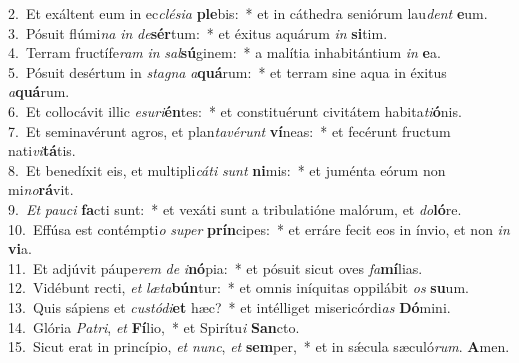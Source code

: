 {2.~}Et exáltent eum in ec\textit{clé}\textit{si}\textit{a} \textbf{ple}bis:~* et in cáthedra seniórum lau\textit{dent} \textbf{e}um.\\
{3.~}Pósuit flúmi\textit{na} \textit{in} \textit{de}\textbf{sér}tum:~* et éxitus aquárum \textit{in} \textbf{si}tim.\\
{4.~}Terram fructífe\textit{ram} \textit{in} \textit{sal}\textbf{sú}ginem:~* a malítia inhabitántium \textit{in} \textbf{e}a.\\
{5.~}Pósuit desértum in \textit{sta}\textit{gna} \textit{a}\textbf{quá}rum:~* et terram sine aqua in éxitus \textit{a}\textbf{quá}rum.\\
{6.~}Et collocávit illic \textit{e}\textit{su}\textit{ri}\textbf{én}tes:~* et constituérunt civitátem habita\textit{ti}\textbf{ó}nis.\\
{7.~}Et seminavérunt agros, et plan\textit{ta}\textit{vé}\textit{runt} \textbf{ví}neas:~* et fecérunt fructum nati\textit{vi}\textbf{tá}tis.\\
{8.~}Et benedíxit eis, et multipli\textit{cá}\textit{ti} \textit{sunt} \textbf{ni}mis:~* et juménta eórum non mi\textit{no}\textbf{rá}vit.\\
{9.~}\textit{Et} \textit{pau}\textit{ci} \textbf{fa}cti sunt:~* et vexáti sunt a tribulatióne malórum, et \textit{do}\textbf{ló}re.\\
{10.~}Effúsa est contémpti\textit{o} \textit{su}\textit{per} \textbf{prín}cipes:~* et erráre fecit eos in ínvio, et non \textit{in} \textbf{vi}a.\\
{11.~}Et adjúvit páupe\textit{rem} \textit{de} \textit{i}\textbf{nó}pia:~* et pósuit sicut oves \textit{fa}\textbf{mí}lias.\\
{12.~}Vidébunt recti, \textit{et} \textit{læ}\textit{ta}\textbf{bún}tur:~* et omnis iníquitas oppilábit \textit{os} \textbf{su}um.\\
{13.~}Quis sápiens et \textit{cu}\textit{stó}\textit{di}\textbf{et} hæc?~* et intélliget misericórdi\textit{as} \textbf{Dó}mini.\\
{14.~}Glória \textit{Pa}\textit{tri}, \textit{et} \textbf{Fí}lio,~* et Spirítu\textit{i} \textbf{San}cto.\\
{15.~}Sicut erat in princípio, \textit{et} \textit{nunc}, \textit{et} \textbf{sem}per,~* et in sǽcula sæculó\textit{rum}. \textbf{A}men.\\
